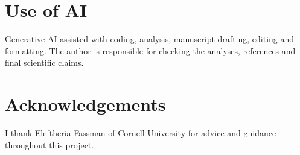 \section*{Use of AI}
Generative AI assisted with coding, analysis, manuscript drafting, editing and formatting. The author is responsible for checking the analyses, references and final scientific claims.

\section*{Acknowledgements}
I thank Eleftheria Fassman of Cornell University for advice and guidance throughout this project.



